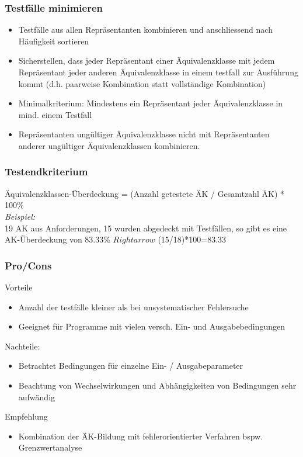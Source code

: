 \documentclass{report}
\theoremstyle{definition}
\theoremstyle{example}
\begin{document}
\subsubsection{Testfälle minimieren}
\begin{itemize}
   \item Testfälle aus allen Repräsentanten kombinieren und anschliessend nach Häufigkeit sortieren
   \item Sicherstellen, dass jeder Repräsentant einer Äquivalenzklasse mit jedem Repräsentant jeder anderen Äquivalenzklasse in einem testfall zur Ausführung kommt (d.h. paarweise Kombination statt vollständige Kombination)
   \item Minimalkriterium: Mindestens ein Repräsentant jeder Äquivalenzklasse in mind. einem Testfall
   \item Repräsentanten ungültiger Äquivalenzklasse nicht mit Repräsentanten anderer ungültiger Äquivalenzklassen kombinieren.
\end{itemize}

\subsubsection{Testendkriterium}
Äquivalenzklassen-Überdeckung = (Anzahl getestete ÄK / Gesamtzahl ÄK) * 100\% \\
\textit{Beispiel:}\\
19 AK aus Anforderungen, 15 wurden abgedeckt mit Testfällen, so gibt es eine AK-Überdeckung von 83.33\% $Rightarrow$ (15/18)*100=83.33

\subsubsection{Pro/Cons}
Vorteile
\begin{itemize}
   \item Anzahl der testfälle kleiner als bei unsystematischer Fehlersuche
   \item Geeignet für Programme mit vielen versch. Ein- und Ausgabebedingungen
\end{itemize}

Nachteile:
\begin{itemize}
   \item Betrachtet Bedingungen für einzelne Ein- / Ausgabeparameter
   \item Beachtung von Wechselwirkungen und Abhängigkeiten von Bedingungen sehr aufwändig
\end{itemize}

Empfehlung
\begin{itemize}
   \item Kombination der ÄK-Bildung mit fehlerorientierter Verfahren bspw. Grenzwertanalyse
\end{itemize}
\end{document}
